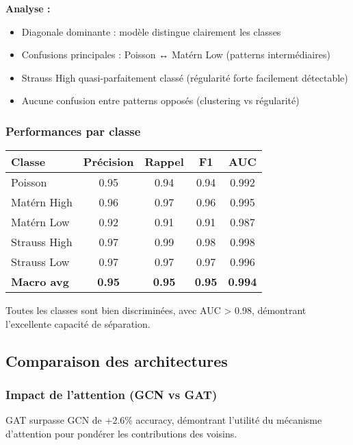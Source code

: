 \textbf{Analyse :}
\begin{itemize}
    \item Diagonale dominante : modèle distingue clairement les classes
    \item Confusions principales : Poisson ↔ Matérn Low (patterns intermédiaires)
    \item Strauss High quasi-parfaitement classé (régularité forte facilement détectable)
    \item Aucune confusion entre patterns opposés (clustering vs régularité)
\end{itemize}

\subsubsection{Performances par classe}

\begin{center}
\begin{tabular}{|l|c|c|c|c|}
\hline
\textbf{Classe} & \textbf{Précision} & \textbf{Rappel} & \textbf{F1} & \textbf{AUC} \\
\hline
Poisson & 0.95 & 0.94 & 0.94 & 0.992 \\
Matérn High & 0.96 & 0.97 & 0.96 & 0.995 \\
Matérn Low & 0.92 & 0.91 & 0.91 & 0.987 \\
Strauss High & 0.97 & 0.99 & 0.98 & 0.998 \\
Strauss Low & 0.97 & 0.97 & 0.97 & 0.996 \\
\hline
\textbf{Macro avg} & \textbf{0.95} & \textbf{0.95} & \textbf{0.95} & \textbf{0.994} \\
\hline
\end{tabular}
\end{center}

Toutes les classes sont bien discriminées, avec AUC > 0.98, démontrant l'excellente capacité de séparation.

\subsection{Comparaison des architectures}

\subsubsection{Impact de l'attention (GCN vs GAT)}

GAT surpasse GCN de +2.6\% accuracy, démontrant l'utilité du mécanisme d'attention pour pondérer les contributions des voisins.

